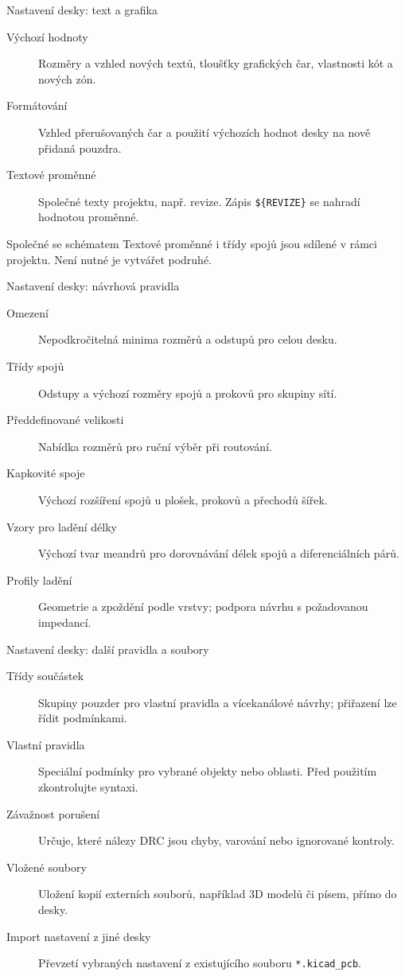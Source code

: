 \documentclass{beamer}
\begin{document}
\begin{frame}{Nastavení desky: text a grafika}
	\begin{description}
		\item[Výchozí hodnoty] Rozměry a vzhled nových textů, tloušťky grafických čar, vlastnosti kót a nových zón.
		\item[Formátování] Vzhled přerušovaných čar a použití výchozích hodnot desky na nově přidaná pouzdra.
		\item[Textové proměnné] Společné texty projektu, např. revize. Zápis \texttt{\$\{REVIZE\}} se nahradí hodnotou proměnné.
	\end{description}
	\begin{block}{Společné se schématem}
	Textové proměnné i třídy spojů jsou sdílené v rámci projektu. Není nutné je vytvářet podruhé.
	\end{block}
\end{frame}

\begin{frame}{Nastavení desky: návrhová pravidla}
	\small
	\begin{description}
		\item[Omezení] Nepodkročitelná minima rozměrů a odstupů pro celou desku.
		\item[Třídy spojů] Odstupy a výchozí rozměry spojů a prokovů pro skupiny sítí.
		\item[Předdefinované velikosti] Nabídka rozměrů pro ruční výběr při routování.
		\item[Kapkovité spoje] Výchozí rozšíření spojů u plošek, prokovů a přechodů šířek.
		\item[Vzory pro ladění délky] Výchozí tvar meandrů pro dorovnávání délek spojů a diferenciálních párů.
		\item[Profily ladění] Geometrie a zpoždění podle vrstvy; podpora návrhu s požadovanou impedancí.
	\end{description}
\end{frame}

\begin{frame}{Nastavení desky: další pravidla a soubory}
	\small
	\begin{description}
		\item[Třídy součástek] Skupiny pouzder pro vlastní pravidla a vícekanálové návrhy; přiřazení lze řídit podmínkami.
		\item[Vlastní pravidla] Speciální podmínky pro vybrané objekty nebo oblasti. Před použitím zkontrolujte syntaxi.
		\item[Závažnost porušení] Určuje, které nálezy DRC jsou chyby, varování nebo ignorované kontroly.
		\item[Vložené soubory] Uložení kopií externích souborů, například 3D modelů či písem, přímo do desky.
		\item[Import nastavení z jiné desky] Převzetí vybraných nastavení z existujícího souboru \texttt{*.kicad\_pcb}.
	\end{description}
\end{frame}
\end{document}
